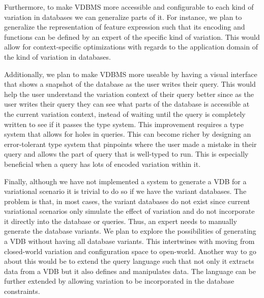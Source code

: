 %
Furthermore, to make VDBMS more accessible and configurable to each 
kind of variation in databases we can generalize parts of it. For instance, 
we plan to generalize the representation of feature expression  such that its encoding and functions
can be defined by an expert of the specific kind of variation. This would allow
for context-specific optimizations with regards to the application domain 
of the kind of variation in databases.

%
Additionally, we plan to make VDBMS more useable by having a visual 
interface that shows a snapshot of the database as the user writes their
query. This would help the user understand the variation context of their 
query better since as the user writes their query they can see what parts
of the database is accessible at the current variation context, instead of waiting until 
the query is completely written to see if it passes the type system.
%
This improvement requires a type system that allows for holes in queries.
This can become richer by 
designing an error-tolerant type system that pinpoints
where the user made a mistake in their query and allows the part of
query that is well-typed to run. This is especially beneficial when a query has lots of 
encoded variation within it. 

%
Finally, although we have not implemented a system to generate a VDB for 
a variational scenario it is trivial to do so if we have the variant databases.
The problem is that, in most cases, the variant databases do not exist
since current variational scenarios only simulate the effect of variation
and do not incorporate it directly into the database or queries.
Thus, an expert needs to manually generate the database variants.
%
We plan to explore the possibilities of generating a VDB without 
having all database variants. This intertwines with moving from closed-world
variation and configuration space to open-world. 
%
Another way to go about this would be to extend the query language such that 
not only it extracts data from a VDB but it also defines and manipulates data.
The language can be further extended by allowing variation to be incorporated 
in the database constraints.



